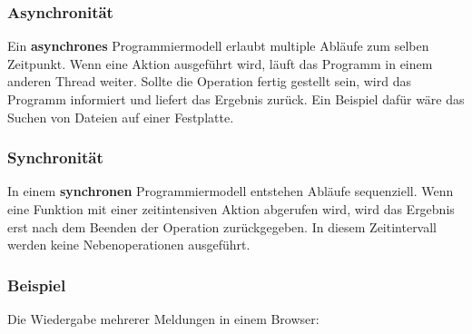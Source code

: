 \subsubsection{Asynchronität}

Ein \textbf{asynchrones} Programmiermodell erlaubt multiple Abläufe zum selben Zeitpunkt. Wenn eine Aktion ausgeführt wird, läuft das Programm in einem anderen \glqq Thread\grqq{} weiter. Sollte die Operation fertig gestellt sein, wird das Programm informiert und liefert das Ergebnis zurück. Ein Beispiel dafür wäre das Suchen von Dateien auf einer Festplatte.\cite{asynchronitaet} \\

\subsubsection{Synchronität}

In einem \textbf{synchronen} Programmiermodell entstehen Abläufe sequenziell. Wenn eine Funktion mit einer zeitintensiven Aktion abgerufen wird, wird das Ergebnis erst nach dem Beenden der Operation zurückgegeben. In diesem Zeitintervall werden keine Nebenoperationen ausgeführt.\cite{asynchronitaet} \\

\subsubsection{Beispiel}

Die Wiedergabe mehrerer Meldungen in einem Browser:

